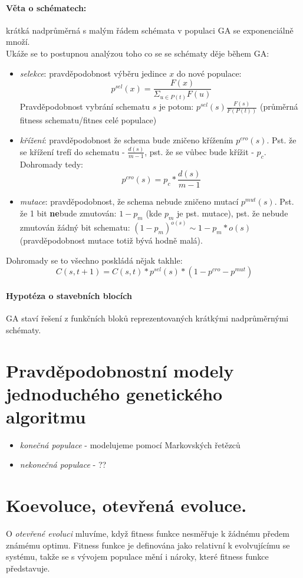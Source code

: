 \documentclass[a4paper]{article}      %
\begin{document}
\paragraph{Věta o schématech:} krátká nadprůměrná s malým řádem schémata v populaci GA se exponenciálně množí.\\
Ukáže se to postupnou analýzou toho co se se schématy děje během GA:
\begin{itemize}
\item \emph{selekce}: pravděpodobnost výběru jedince $x$ do nové populace:
\[
p^{sel}(x) = \frac{F(x)}{\Sigma_{u \in P(t)} F(u)}
\]
Pravděpodobnost vybrání schematu $s$ je potom: $p^{sel}(s)\frac{F(s)}{F(P(t))}$ (průměrná fitness schematu/fitnes celé populace)
\item \emph{křížení}: pravděpodobnost že schema bude zničeno křížením $p^{cro}(s)$. Pst. že se křížení trefí do schematu - $\frac{d(s)}{m-1}$, pst. že se vůbec bude křížit - $p_c$. Dohromady tedy:
\[
p^{cro}(s)=p_c*\frac{d(s)}{m-1}
\]
\item \emph{mutace}: pravděpodobnost, že schema nebude zničeno mutací $p^{mut}(s)$. Pst. že 1 bit \textbf{ne}bude zmutován: $1-p_m$ (kde $p_m$ je pst. mutace), pst. že nebude zmutován žádný bit schematu: $(1-p_m)^{o(s)} \sim 1 - p_{m}*o(s)$
(pravděpodobnost mutace totiž bývá hodně malá).
\end{itemize}
Dohromady se to všechno poskládá nějak takhle:
\[
C(s,t+1) = C(s,t)*p^{sel}(s)*(1-p^{cro}-p^{mut})
\]

\paragraph{Hypotéza o stavebních blocích} GA staví řešení z funkčních bloků reprezentovaných krátkými nadprůměrnými schématy.


\section{Pravděpodobnostní modely jednoduchého genetického algoritmu}
\begin{itemize}
\item \emph{konečná populace} - modelujeme pomocí Markovských řetězců
\item \emph{nekonečná populace} - ??
\end{itemize}


\section{Koevoluce, otevřená evoluce.} O \emph{otevřené evoluci} mluvíme, když fitness funkce nesměřuje k žádnému předem známému optimu.
Fitness funkce je definována jako relativní k evolvujícímu se systému, takže se s vývojem populace mění i nároky, které fitness funkce představuje.
\end{document}
